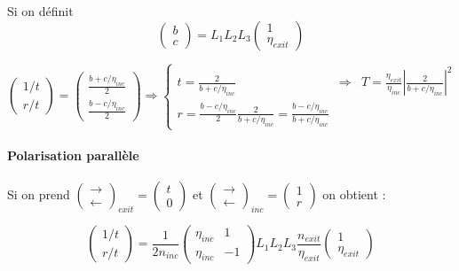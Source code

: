 \documentclass[a4paper,english]{article}
\begin{document}
Si on définit
\begin{dmath}
\begin{pmatrix} b \\ c \end{pmatrix} = L_1 L_2 L_3 \begin{pmatrix} 1 \\ \eta_{exit} \end{pmatrix}
\end{dmath}


\begin{dmath}
\begin{pmatrix}1/t \\ r/t \end{pmatrix} = \begin{pmatrix} \frac{b + c / \eta_{inc}}{2} \\ \frac{b - c / \eta_{inc}}{2} \end{pmatrix} \Rightarrow
\left\{ \begin{array}{lll}
	t = \frac{2}{b + c / \eta_{inc}} &\Rightarrow & T = \frac{\eta_{exit}}{\eta_{inc}} \left| \frac{2}{b + c / \eta_{inc}} \right|^2 \\
	r = \frac{b - c / \eta_{inc}}{2} \frac{2}{b + c / \eta_{inc}} = \frac{b - c / \eta_{inc}}{b + c / \eta_{inc}}
\end{array} \right.
\end{dmath}


\paragraph{Polarisation parallèle}
Si on prend $\begin{pmatrix}\rightarrow \\ \leftarrow\end{pmatrix}_{exit} = \begin{pmatrix}t \\ 0\end{pmatrix}$ et $\begin{pmatrix}\rightarrow \\ \leftarrow\end{pmatrix}_{inc} = \begin{pmatrix}1 \\ r\end{pmatrix}$ on obtient :

\begin{dmath}
\begin{pmatrix}1/t \\ r/t \end{pmatrix} = \frac{1}{2 n_{inc}} \begin{pmatrix} \eta_{inc} & 1 \\ \eta_{inc} & -1 \end{pmatrix} L_1 L_2 L_3 \frac{n_{exit}}{\eta_{exit}} \begin{pmatrix} 1 \\ \eta_{exit} \end{pmatrix}
\end{dmath}
\end{document}
